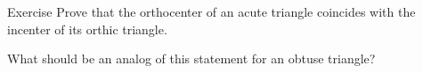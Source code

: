 \begin{thm}{Exercise}\label{ex:orthic-triangle}
Prove that the orthocenter of an acute triangle coincides with the incenter of its orthic triangle.

What should be an analog of this statement for an obtuse triangle?
\end{thm}


